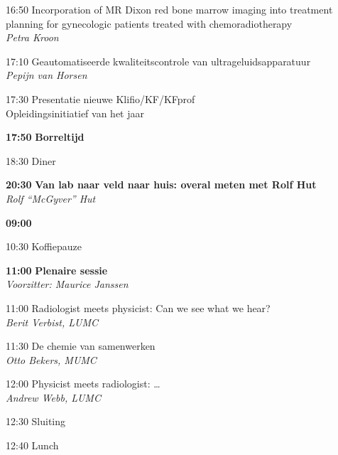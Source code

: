 \documentclass[a4paper,10pt]{report}
\begin{document}
\begin{multicols*}{3}
\begin{packed_enum}
    \item[16:50] Incorporation of MR Dixon red bone marrow imaging into treatment planning for gynecologic patients treated with chemoradiotherapy\\\textit{Petra Kroon}
    \item[17:10] Geautomatiseerde kwaliteitscontrole van ultrageluidsapparatuur\\\textit{Pepijn van Horsen}
        \vfill
    \item[17:30] Presentatie nieuwe Klifio/KF/KFprof\\Opleidingsinitiatief van het jaar
        \vfill
    \item[\textbf{17:50}] {\textbf{Borreltijd}}
        \vfill
    \item[18:30] Diner
        \vfill
    \item[\textbf{20:30}] {\textbf{Van lab naar veld naar huis: overal meten
        met Rolf Hut}}\\\textit{Rolf ``McGyver'' Hut}
\end{packed_enum}

\columnbreak


\begin{packed_enum}

\item[{\color{Blue} {\textbf{09:00}}}]{}
        \vfill
\item[10:30] Koffiepauze
        \vfill
\item[\textbf{11:00}] {\textbf{Plenaire sessie}}\\\textit{Voorzitter: Maurice Janssen}
\item[11:00] Radiologist meets physicist: Can we see what we hear?\\\textit{Berit Verbist, LUMC}
\item[11:30] De chemie van samenwerken\\\textit{Otto Bekers, MUMC}
\item[12:00] Physicist meets radiologist: \ldots\\\textit{Andrew Webb, LUMC}
        \vfill
\item[12:30] Sluiting
\item[12:40] Lunch


\end{packed_enum}
\end{multicols*}
\end{document}
